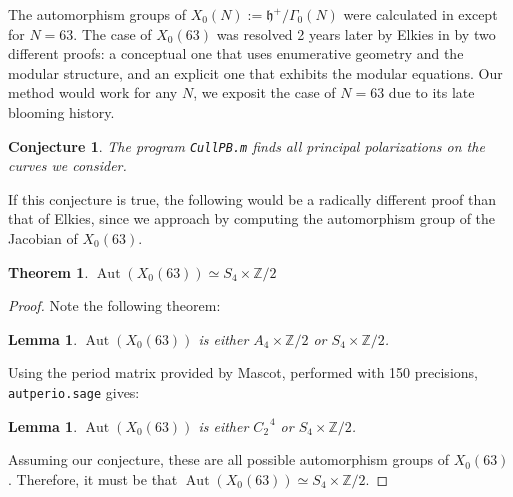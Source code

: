 \documentclass[12pt,reqno]{amsart}
\DeclareMathOperator{\Aut}{Aut}
\DeclareMathOperator{\Jac}{Jac}
\newcommand{\Z}{\mathbb{Z}}
\newtheorem*{thm*}{Theorem}
\newtheorem{lemma}[theorem]{Lemma}
\newtheorem*{lemma*}{Lemma}
\newtheorem*{conjecture*}{Conjecture}
\theoremstyle{definition}
\theoremstyle{remark}
\begin{document}
The automorphism groups of $X_0(N) := \mathfrak{h}^{+} / \Gamma_0(N)$ were calculated in \cite{km} except for $N=63$. The case of $X_0(63)$ was resolved 2 years later by Elkies in \cite{elkies} by two different proofs: a conceptual one that uses enumerative geometry and the modular structure, and an explicit one that exhibits the modular equations. Our method would work for any $N$, we exposit the case of $N=63$ due to its late blooming history.


\begin{conjecture*} \label{63conj} The program \texttt{CullPB.m} finds all principal polarizations on the curves we consider. \end{conjecture*}

If this conjecture is true, the following would be a radically different proof than that of Elkies, since we approach by computing the automorphism group of the Jacobian of $X_0(63)$. 

\begin{thm*} $\Aut(X_0(63)) \simeq S_4 \times \Z/2$ \end{thm*} 

\begin{proof} Note the following theorem:

\begin{lemma*} \cite{km} $\Aut(X_0(63))$ is either $A_4 \times \Z/2$ or $S_4 \times \Z/2$. 
\end{lemma*}

Using the period matrix provided by Mascot, performed with 150 precisions, \texttt{autperio.sage} gives:

\begin{lemma} $\Aut(X_0(63))$ is either $C_2^{\text{ }4}$ or $S_4 \times \Z/2$.
\end{lemma}

Assuming our conjecture, these are all possible automorphism groups of $X_0(63)$. Therefore, it must be that $\Aut(X_0(63)) \simeq S_4 \times \Z/2$. 
\end{proof} 
\end{document}

